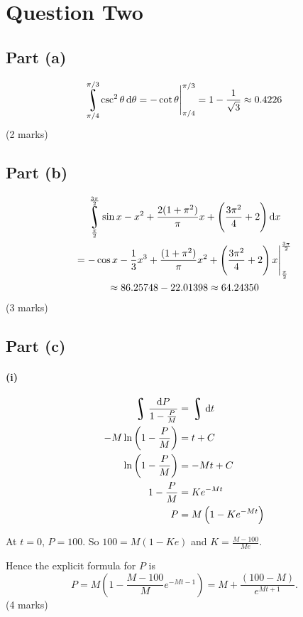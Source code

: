 \documentclass[a4paper]{report}
\DeclareMathOperator*{\rint}{\scalerel*{\rotatebox{17}{$\!\int\!$}}{\int}}
\begin{document}
\section*{Question Two}
\subsection*{Part (a)}
\begin{displaymath}
  \rint^{\pi/3}_{\pi/4} \csc^2 \theta \dif{\theta} = \eval{-\cot \theta}^{\pi/3}_{\pi/4} = 1 - \frac{1}{\sqrt{3}} \approx 0.4226
\end{displaymath}
(2 marks)

\subsection*{Part (b)}
\begin{multline*}
  \rint^{\frac{3\pi}{2}}_{\frac{\pi}{2}} \sin x - x^2 + \frac{2(1 + \pi^2)}{\pi} x + \left( \frac{3\pi^2}{4} + 2 \right) \dif{x}\\
    = \eval{-\cos x - \frac{1}{3}x^3 + \frac{(1 + \pi^2)}{\pi} x^2 + \left( \frac{3\pi^2}{4} + 2 \right)x}^{\frac{3\pi}{2}}_{\frac{\pi}{2}}\\
    \approx 86.25748 - 22.01398 \approx 64.24350
\end{multline*}
(3 marks)

\subsection*{Part (c)}
\paragraph{(i)}
\begin{align*}
  \rint \frac{\dif{P}}{1 - \frac{P}{M}} &= \rint \dif{t}\\
  -M\ln\left(1 - \frac{P}{M}\right) &= t + C\\
  \ln \left(1 - \frac{P}{M}\right) &= -Mt + C\\
  1 - \frac{P}{M} &= Ke^{-Mt}\\
  P &= M\left(1 - Ke^{-Mt}\right)
\end{align*}

At $ t = 0 $, $ P = 100 $. So $ 100 = M(1 - Ke) $ and $ K = \frac{M - 100}{Me} $.

Hence the explicit formula for $ P $ is
\begin{displaymath}
  P = M\left(1 - \frac{M - 100}{M}e^{-Mt - 1} \right) = M + \frac{(100 - M)}{e^{Mt + 1}}.
\end{displaymath}
(4 marks)
\end{document}
